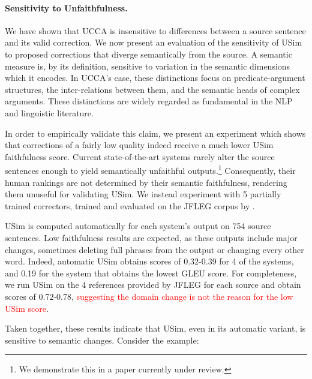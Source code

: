 \documentclass[a4paper, 11pt]{article}
\begin{document}
\paragraph{Sensitivity to Unfaithfulness.}

We have shown that UCCA is insensitive to differences between a source sentence
and its valid correction. We now present an evaluation of the sensitivity of {\sc USim}
to proposed corrections that diverge semantically from the source.
A semantic measure is, by its definition, sensitive to variation in
the semantic dimensions which it encodes. 
In UCCA's case, these distinctions focus on predicate-argument structures,
the inter-relations between them, and the semantic heads of complex arguments.
These distinctions are widely regarded as fundamental in the NLP and linguistic literature.

In order to empirically validate this claim, we present an experiment which shows that corrections
of a fairly low quality indeed receive a much lower {\sc USim} faithfulness score.
Current state-of-the-art systems rarely alter the source sentences enough to yield semantically unfaithful outputs.\footnote{We demonstrate this in a paper currently under review.}
Consequently, their human rankings are not determined by their semantic faithfulness, rendering them unuseful for validating {\sc USim}.
We instead experiment with 5 partially trained correctors, trained and evaluated on the
JFLEG corpus \cite{napoles2017jfleg} by .

{\sc USim} is computed automatically for each system's output on 754 source sentences.
Low faithfulness results are expected, as these outputs include major changes,
sometimes deleting full phrases from the output or changing every other word.
Indeed, automatic {\sc USim} obtains scores of 0.32-0.39 for 4 of the systems, and 0.19
for the system that obtains the lowest GLEU \cite{napoles2015ground} score.
For completeness, we run {\sc USim} on the 4 references provided by JFLEG for each
source and obtain scores of 0.72-0.78, \textcolor{red}{suggesting the domain change is not the reason for the low {\sc USim} score}.

Taken together, these results indicate that {\sc USim}, even in its automatic variant,
is sensitive to semantic changes. Consider the example: 
\end{document}
